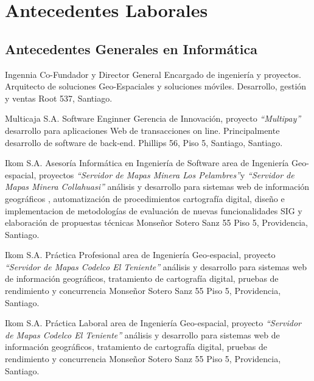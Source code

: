 \section{Antecedentes Laborales}

\subsection{Antecedentes Generales en Informática}
	{Ingennia} %
	{Co-Fundador y Director General} %
	{Encargado de ingenier\'ia y proyectos. Arquitecto de soluciones Geo-Espaciales y soluciones móviles.}
	{Desarrollo, gestión y ventas}
	{Root 537, Santiago.}
	

	{Multicaja S.A.} %
	{Software Enginner} %
	{Gerencia de Innovaci\'on, proyecto \textit{``Multipay''}}
	{desarrollo para aplicaciones Web de transacciones on line. Principalmente desarrollo de software de back-end.}
	{Phillips 56, Piso 5, Santiago, Santiago.}

	{Ikom S.A.}	%
	{Asesor\'ia Inform\'atica en Ingenier\'ia de Software} %
	{area de Ingenier\'ia Geo-espacial, proyectos
	\textit{``Servidor de Mapas Minera Los Pelambres''}y \textit{``Servidor de Mapas Minera 
	Collahuasi''}}
	{an\'alisis y desarrollo para sistemas web de informaci\'on geogr\'aficos , 
	automatizaci\'on de procedimientos cartograf\'ia digital, dise\~no e implementacion de 
	metodolog\'ias de evaluaci\'on de nuevas funcionalidades SIG y elaboración de 
	propuestas técnicas}
	{Monse\~nor Sotero Sanz 55 Piso 5, Providencia, Santiago.}
	

	{Ikom S.A.}	%
	{Pr\'actica Profesional} %
	{area de Ingenier\'ia Geo-espacial,
	proyecto \textit{``Servidor de Mapas Codelco El Teniente''}}
	{an\'alisis y desarrollo para sistemas web de informaci\'on geogr\'aficos, tratamiento 
	de cartograf\'ia digital, pruebas de rendimiento y concurrencia}
	{Monse\~nor Sotero Sanz 55 Piso 5, Providencia, Santiago.}
	
	{Ikom S.A.}	%
	{Pr\'actica Laboral} %
	{area de Ingenier\'ia Geo-espacial, 
	proyecto \textit{``Servidor de Mapas Codelco El Teniente''}} %
	{an\'alisis y desarrollo para sistemas web de informaci\'on geogr\'aficos, tratamiento 
	de cartograf\'ia digital, pruebas de rendimiento y concurrencia} %
	{Monse\~nor Sotero Sanz 55 Piso 5, Providencia, Santiago.}
	
